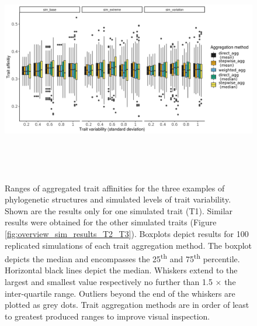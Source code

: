 \documentclass[12pt]{article}
\begin{document}
\begin{figure}[H]
    \centering
    \includegraphics[width=16.5cm, height=10cm]{Overview_sim_results.png}
    \caption{Ranges of aggregated trait affinities for the three examples of phylogenetic structures and simulated levels of trait variability. Shown are the results only for one simulated trait (T1). Similar results were obtained for the other simulated traits (Figure \ref{fig:overview_sim_results_T2_T3}). Boxplots depict results for 100 replicated simulations of each trait aggregation method. The boxplot depicts the median and encompasses the 25\textsuperscript{th} and 75\textsuperscript{th} percentile. Horizontal black lines depict the median. Whiskers extend to the largest and smallest value respectively no further than 1.5 $\times$ the inter-quartile range. Outliers beyond the end of the whiskers are plotted as grey dots. Trait aggregation methods are in order of least to greatest produced ranges to improve visual inspection.}
    \label{fig:overview_sim_results}
  \end{figure}
\end{document}
